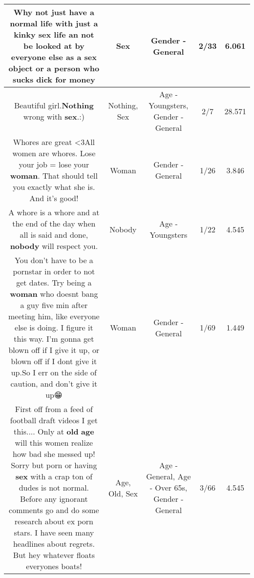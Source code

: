 \documentclass[11pt]{article}
\newlength\mylength
\begin{document}
\begin{center}
\begin{longtable}{|C{.65\mylength}|C{.30\mylength}|C{.12\mylength}|C{.12\mylength}|C{.12\mylength}|}
  \small Why not just have a normal life with just a kinky \textbf{sex} life an not be looked at by everyone else as a \textbf{sex} object or a person who sucks dick for money\normalsize   & Sex & Gender - General & 2/33 & 6.061 \\  \hline
  \small Beautiful girl.\textbf{Nothing} wrong with \textbf{sex}.:)\normalsize   & Nothing, Sex & Age - Youngsters, Gender - General & 2/7 & 28.571 \\  \hline
  \small Whores are great <3All women are whores. Lose your job = lose your \textbf{woman}. That should tell you exactly what she is. And it's good!\normalsize   & Woman & Gender - General & 1/26 & 3.846 \\  \hline
  \small A whore is a whore and at the end of the day when all is said and done, \textbf{nobody} will respect you.\normalsize   & Nobody & Age - Youngsters & 1/22 & 4.545 \\  \hline
  \small You don't have to be a pornstar in order to not get dates. Try being a \textbf{woman} who doesnt bang a guy five min after meeting him, like everyone else is doing. I figure it this way. I'm gonna get blown off if I give it up, or blown off if I dont give it up.So I err on the side of caution, and don't give it up😁\normalsize   & Woman & Gender - General & 1/69 & 1.449 \\  \hline
  \small First off from a feed of football draft videos I get this.... Only at \textbf{old} \textbf{age} will this women realize how bad she messed up! Sorry but porn or having \textbf{sex} with a crap ton of dudes is not normal. Before any ignorant comments go and do some research about ex porn stars. I have seen many headlines about regrets. But hey whatever floats everyones boats!\normalsize   & Age, Old, Sex & Age - General, Age - Over 65s, Gender - General & 3/66 & 4.545 \\  \hline

\end{longtable}
\end{center}
\end{document}
